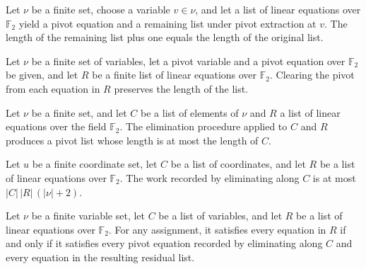 \begin{theorem}
\leanok
{}
Let $\nu$ be a finite set, choose a variable $v\in\nu$, and let a list of linear
equations over $\mathbb F_2$ yield a pivot equation and a remaining list under pivot
extraction at $v$. The length of the remaining list plus one equals the length of the
original list.
\end{theorem}

\begin{theorem}
\leanok
{}
Let $\nu$ be a finite set of variables, let a pivot variable and a pivot equation over
$\mathbb{F}_2$ be given, and let $R$ be a finite list of linear equations over
$\mathbb{F}_2$. Clearing the pivot from each equation in $R$ preserves the length of the
list.
\end{theorem}

\begin{theorem}
\leanok
{}
Let $\nu$ be a finite set, and let $C$ be a list of elements of $\nu$ and $R$ a list of
linear equations over the field $\mathbb{F}_2$. The elimination procedure applied to $C$
and $R$ produces a pivot list whose length is at most the length of $C$.
\end{theorem}

\begin{theorem}
\leanok
{}
Let $
u$ be a finite coordinate set, let $C$ be a list of coordinates, and let $R$ be a list
of linear equations over $\mathbb{F}_2$. The work recorded by eliminating along $C$ is
at most $|C|\,|R|\,(|\nu|+2)$.
\end{theorem}

\begin{theorem}
\leanok
{}
Let $\nu$ be a finite variable set, let $C$ be a list of variables, and let $R$ be a
list of linear equations over $\mathbb{F}_2$. For any assignment, it satisfies every
equation in $R$ if and only if it satisfies every pivot equation recorded by eliminating
along $C$ and every equation in the resulting residual list.
\end{theorem}

